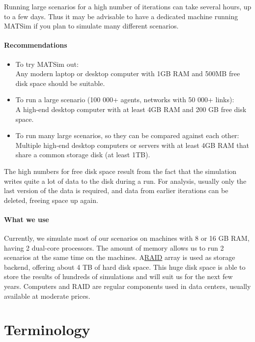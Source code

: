 \documentclass[a4paper,11pt]{report}
\begin{document}
Running large scenarios for  a high number of iterations can take several hours, up to a few days.  Thus it may be advisable to have a dedicated machine running MATSim if  you plan to simulate many different scenarios.

\subsubsection{Recommendations}
\begin{itemize}
	\item To try MATSim out:
\\Any modern laptop or desktop computer with 1GB RAM and 500MB free disk space should be suitable.
	\item To run a large scenario (100 000+ agents, networks with 50 000+ links): 
\\A high-end desktop computer with at least 4GB RAM and 200 GB free disk space.
	\item To run many large scenarios, so they can be compared against each other: 
\\Multiple high-end desktop computers or servers with at least 4GB RAM that share a common storage disk (at least 1TB).
\end{itemize}

The  high numbers for free disk space result from the fact that the  simulation writes quite a lot of data to the disk during a run. For  analysis, usually only the last version of the data is required, and  data from earlier iterations can be deleted, freeing space up again.

\subsubsection{What we use}

Currently,  we simulate most of our scenarios on machines with 8 or 16 GB RAM,  having 2 dual-core processors. The amount of memory allows us to run 2  scenarios at the same time on the machines. A\href{http://en.wikipedia.org/wiki/RAID}{RAID}  array is used as storage backend, offering about 4 TB of hard disk  space. This huge disk space is able to store the results of hundreds of  simulations and will suit us for the next few years. Computers and RAID  are regular components used in data centers, usually available at  moderate prices.

\chapter{Terminology}
\end{document}
